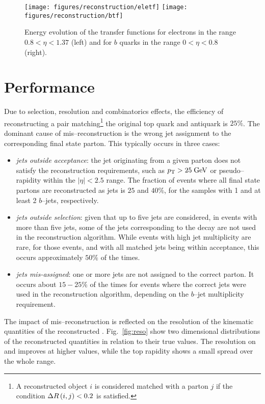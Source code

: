 \begin{figure}[!htb]\centering
  \texttt{[image: figures/reconstruction/eletf]}
  \texttt{[image: figures/reconstruction/btf]}
  \caption[Energy evolution of transfer functions]{
    Energy evolution of the transfer functions for electrons in the
    range $0.8<\eta<1.37$ (left) and for $b$ quarks in the range
    $0<\eta<0.8$ (right). 
    \label{fig:transferfunctions}
    }
\end{figure}

\section{Performance}

Due to selection, resolution and combinatorics effects, the efficiency
of reconstructing a \ttbar{} pair matching\footnote{A reconstructed
  object $i$ is considered matched with a parton $j$ if the condition
  $\Delta{}R\left(i, j\right)<0.2$ is satisfied.} the original top quark and antiquark is
$25\%$. The dominant cause of mis--reconstruction is the wrong jet
assignment to the corresponding \ttbar{} final state parton. This
typically occurs in three cases:
\begin{itemize}
\item {\it jets outside acceptance}: the jet originating from a given
  parton does not satisfy the reconstruction requirements, such as
  $p_{\mathrm{T}}{}>25 \; \mathrm{GeV}$ or pseudo--rapidity within the $|\eta|<2.5$ range.
  The fraction of events where all \ttbar{} final state partons are
  reconstructed as jets is $25$ and $40\%$, for the samples with 1 and
  at least 2 $b$--jets, respectively.
\item {\it jets outside selection}: given that up to five jets are
  considered, in events with more
  than five jets, some of the jets corresponding to
  the \ttbar{} decay are not used in the reconstruction algorithm.
  While events with high jet multiplicity are rare, for those events,
  and with all matched jets being within acceptance,
  this occurs approximately $50\%$ of the times. 
\item {\it jets mis-assigned}: one or more jets are not assigned to
  the correct parton. It occurs about $15-25\%$ of the times for
  events where the correct jets were used in the reconstruction
  algorithm, depending on the $b$--jet multiplicity requirement.
\end{itemize}

The impact of mis--reconstruction is reflected on the resolution of
the kinematic quantities of the reconstructed
\ttbar. Fig.~\ref{fig:reso} show two dimensional distributions of
the reconstructed quantities in relation to their true values. The
resolution on \mtt{} and \pttt{} improves at higher values, while the
top rapidity shows a small spread over the whole range.

